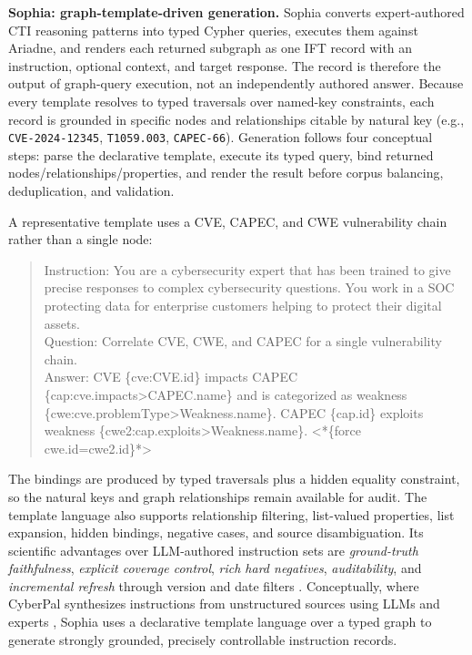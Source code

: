\documentclass[conference]{IEEEtran}
\providecommand{\hfid}[1]{{\small\nolinkurl{#1}}}
\begin{document}
\textbf{Sophia: graph-template-driven generation.} Sophia converts expert-authored CTI reasoning patterns into typed Cypher queries, executes them against Ariadne, and renders each returned subgraph as one IFT record with an instruction, optional context, and target response. The record is therefore the output of graph-query execution, not an independently authored answer. Because every template resolves to typed traversals over named-key constraints, each record is grounded in specific nodes and relationships citable by natural key (e.g., \hfid{CVE-2024-12345}, \texttt{T1059.003}, \hfid{CAPEC-66}). Generation follows four conceptual steps: parse the declarative template, execute its typed query, bind returned nodes/relationships/properties, and render the result before corpus balancing, deduplication, and validation.

A representative template uses a CVE, CAPEC, and CWE vulnerability chain rather than a single node:

\begin{quote}\scriptsize\ttfamily\sloppy\setlength{\rightskip}{0pt plus 2em}\noindent
Instruction: You are a cybersecurity expert that has been trained to give precise responses to complex cybersecurity questions. You work in a SOC protecting data for enterprise customers helping to protect their digital assets.\\
Question: Correlate CVE, CWE, and CAPEC for a single vulnerability chain.\\
Answer: CVE \{cve:CVE.id\} impacts CAPEC \{cap:cve.impacts\textgreater{}CAPEC.name\} and is categorized as weakness \{cwe:cve.problemType\textgreater{}Weakness.name\}. CAPEC \{cap.id\} exploits weakness \{cwe2:cap.exploits\textgreater{}Weakness.name\}. \textless{}*\{force cwe.id=cwe2.id\}*\textgreater{}
\end{quote}

\noindent The bindings are produced by typed traversals plus a hidden equality constraint, so the natural keys and graph relationships remain available for audit. The template language also supports relationship filtering, list-valued properties, list expansion, hidden bindings, negative cases, and source disambiguation. Its scientific advantages over LLM-authored instruction sets are \emph{ground-truth faithfulness}, \emph{explicit coverage control}, \emph{rich hard negatives}, \emph{auditability}, and \emph{incremental refresh} through version and date filters \cite{alam2025athenabench}. Conceptually, where CyberPal synthesizes instructions from unstructured sources using LLMs and experts \cite{levi2024cyberpal,levi2025toward}, Sophia uses a declarative template language over a typed graph to generate strongly grounded, precisely controllable instruction records.
\end{document}

